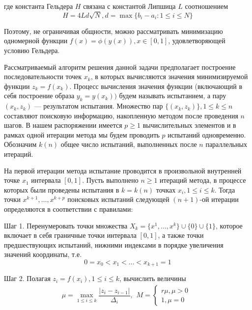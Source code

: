 где константа Гельдера \(H\) связана с константой Липшица \(L\) соотношением 
\begin{displaymath}
H=4Ld\sqrt{N},d=\max\{b_i-a_i:1\leqslant i\leqslant N\}
\end{displaymath}
\par
Поэтому, не ограничивая общности, можно рассматривать минимизацию одномерной функции  \(f(x)=\phi(y(x)), x\in[0,1]\), удовлетворяющей условию Гельдера.
\par
Рассматриваемый алгоритм решения данной задачи предполагает построение последовательности точек \(x_k\), в которых вычисляются значения минимизируемой функции \(z_k = f(x_k)\). Процесс вычисления значения функции (включающий в себя построение образа \(y_k=y(x_k))\) будем называть испытанием, а пару \((x_k,z_k)\) --- результатом испытания. Множество пар \(\{(x_k,z_k)\}, 1\leqslant k\leqslant n\) составляют поисковую информацию, накопленную методом после проведения \(n\) шагов. В нашем распоряжении имеется \(p\geqslant 1\) вычислительных элементов и в рамках одной итерации метода мы будем проводить \(p\) испытаний одновременно. Обозначим \(k(n)\) общее число испытаний, выполненных после \(n\) параллельных итераций.
\par
На первой итерации метода испытание проводится в произвольной внутренней точке \(x_1\) интервала \([0,1]\). Пусть выполнено \(n\geqslant 1\) итераций метода, в процессе которых были проведены испытания в \(k = k(n)\) точках \(x_i, 1\leqslant i\leqslant k\). Тогда точки \(x^{k+1},\dotsc,x^{k+p}\) поисковых испытаний следующей \((n+1)\)-ой итерации определяются в соответствии с правилами:
\par
Шаг 1. Перенумеровать точки множества \(X_k=\{x^1,\dotsc,x^k\}\cup\{0\}\cup\{1\}\), которое включает в себя граничные точки интервала \([0,1]\), а также точки предшествующих испытаний, нижними индексами в порядке увеличения значений координаты, т.е.
\begin{displaymath}
0=x_0<x_1<\dotsc<x_{k+1}=1
\end{displaymath}
\par
Шаг 2. Полагая \(z_i=f(x_i),1\leqslant i\leqslant k\), вычислить величины 
\begin{equation}
\label{step2}
\mu=\max_{1\leqslant i\leqslant k}\dfrac{|z_i-z_{i-1}|}{\Delta_i},
\begin{matrix}
    M = 
    \left\{
    \begin{matrix}
    r\mu,\mu>0 \\
    1,\mu=0
    \end{matrix} \right.
    \end{matrix}
\end{equation}
